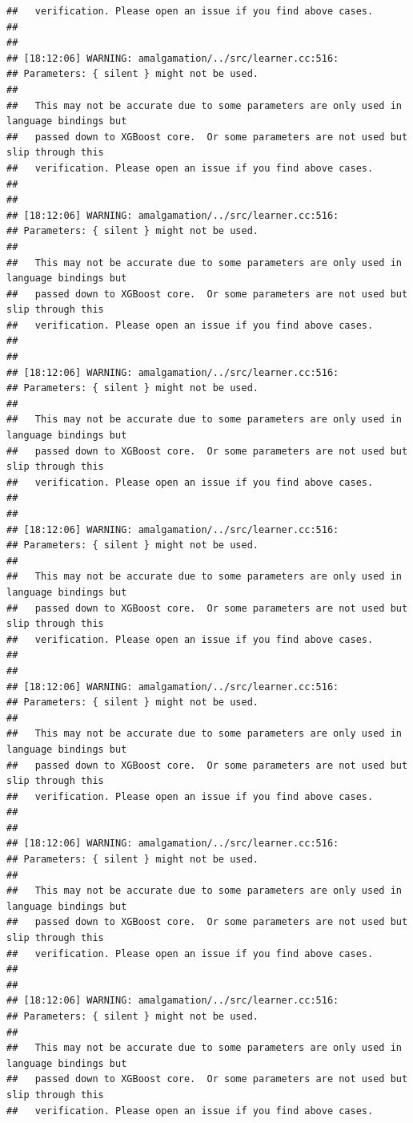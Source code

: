 \documentclass[AMS,STIX2COL]{WileyNJD-v2}\usepackage[]{graphicx}\usepackage[]{color}
\makeatletter
\newenvironment{kframe}{%
 \def\at@end@of@kframe{}%
 \ifinner\ifhmode%
  \def\at@end@of@kframe{\end{minipage}}%
  \begin{minipage}{\columnwidth}%
 \fi\fi%
 \def\FrameCommand##1{\hskip\@totalleftmargin \hskip-\fboxsep
 \colorbox{shadecolor}{##1}\hskip-\fboxsep
     \hskip-\linewidth \hskip-\@totalleftmargin \hskip\columnwidth}%
 \MakeFramed {\advance\hsize-\width
   \@totalleftmargin\z@ \linewidth\hsize
   \@setminipage}}%
 {\par\unskip\endMakeFramed%
 \at@end@of@kframe}
\newenvironment{knitrout}{}{} %
\makeatother
\begin{document}
\begin{knitrout}
\begin{kframe}
\begin{verbatim}
##   verification. Please open an issue if you find above cases.
## 
## 
## [18:12:06] WARNING: amalgamation/../src/learner.cc:516: 
## Parameters: { silent } might not be used.
## 
##   This may not be accurate due to some parameters are only used in language bindings but
##   passed down to XGBoost core.  Or some parameters are not used but slip through this
##   verification. Please open an issue if you find above cases.
## 
## 
## [18:12:06] WARNING: amalgamation/../src/learner.cc:516: 
## Parameters: { silent } might not be used.
## 
##   This may not be accurate due to some parameters are only used in language bindings but
##   passed down to XGBoost core.  Or some parameters are not used but slip through this
##   verification. Please open an issue if you find above cases.
## 
## 
## [18:12:06] WARNING: amalgamation/../src/learner.cc:516: 
## Parameters: { silent } might not be used.
## 
##   This may not be accurate due to some parameters are only used in language bindings but
##   passed down to XGBoost core.  Or some parameters are not used but slip through this
##   verification. Please open an issue if you find above cases.
## 
## 
## [18:12:06] WARNING: amalgamation/../src/learner.cc:516: 
## Parameters: { silent } might not be used.
## 
##   This may not be accurate due to some parameters are only used in language bindings but
##   passed down to XGBoost core.  Or some parameters are not used but slip through this
##   verification. Please open an issue if you find above cases.
## 
## 
## [18:12:06] WARNING: amalgamation/../src/learner.cc:516: 
## Parameters: { silent } might not be used.
## 
##   This may not be accurate due to some parameters are only used in language bindings but
##   passed down to XGBoost core.  Or some parameters are not used but slip through this
##   verification. Please open an issue if you find above cases.
## 
## 
## [18:12:06] WARNING: amalgamation/../src/learner.cc:516: 
## Parameters: { silent } might not be used.
## 
##   This may not be accurate due to some parameters are only used in language bindings but
##   passed down to XGBoost core.  Or some parameters are not used but slip through this
##   verification. Please open an issue if you find above cases.
## 
## 
## [18:12:06] WARNING: amalgamation/../src/learner.cc:516: 
## Parameters: { silent } might not be used.
## 
##   This may not be accurate due to some parameters are only used in language bindings but
##   passed down to XGBoost core.  Or some parameters are not used but slip through this
##   verification. Please open an issue if you find above cases.

\end{verbatim}
\end{kframe}
\end{knitrout}
\end{document}
